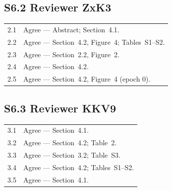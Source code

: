 \documentclass[runningheads]{llncs}
\begin{document}
\subsection*{S6.2 Reviewer ZxK3}
\begin{tabular}{@{}cl@{}}
2.1 & Agree --- Abstract; Section~4.1. \\
2.2 & Agree --- Section~4.2, Figure~4; Tables~S1--S2. \\
2.3 & Agree --- Section~2.2, Figure~2. \\
2.4 & Agree --- Section~4.2. \\
2.5 & Agree --- Section~4.2, Figure~4 (epoch 0). \\
\end{tabular}

\subsection*{S6.3 Reviewer KKV9}
\begin{tabular}{@{}cl@{}}
3.1 & Agree --- Section~4.1. \\
3.2 & Agree --- Section~4.2; Table~2. \\
3.3 & Agree --- Section~3.2; Table~S3. \\
3.4 & Agree --- Section~4.2; Tables~S1--S2. \\
3.5 & Agree --- Section~4.1. \\
\end{tabular}
\end{document}
